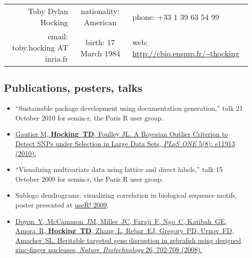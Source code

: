 \documentclass[11pt,a4paper]{article}
\begin{document}
\begin{tabular}{rcl}
{\Large Toby Dylan Hocking} & nationality: American &
phone: +33 1 39 63 54 99
\\
email: toby.hocking AT inria.fr & birth: 17 March 1984& 
web: \url{http://cbio.ensmp.fr/~thocking}
\end{tabular} 

\subsection*{Publications, posters, talks}
\begin{itemize}
\item ``Sustainable package development using documentation generation,'' talk 21 October 2010 for semin-r, the Paris R user group.
\item
\href{http://www.plosone.org/article/info\%3Adoi\%2F10.1371\%2Fjournal.pone.0011913}{Gautier M, {\bf Hocking~TD}, Foulley JL.
A Bayesian Outlier Criterion to Detect SNPs under Selection in Large
Data Sets, \emph{PLoS ONE} 5(8): e11913 (2010).}
\item ``Visualizing
multivariate data using lattice and direct labels,'' talk 15 October
2009 for semin-r, the Paris R user group.
\item Sublogo dendrograms:
visualizing correlation in biological sequence motifs, poster
presented at
\href{http://www.agrocampus-ouest.fr/math/useR-2009/}{useR! 2009}.
\item \href{http://www.ncbi.nlm.nih.gov/pubmed/18500334}{Doyon~Y, McCammon~JM, Miller~JC, Faraji~F, Ngo~C,
Katibah~GE, Amora~R, {\bf Hocking~TD}, Zhang~L, \mbox{Rebar~EJ}, Gregory~PD,
Urnov~FD, Amacher~SL. Heritable targeted gene disruption in zebrafish
using designed zinc-finger nucleases, \emph{Nature~Biotechnology}
26, 702-708 (2008).
}
\end{itemize}
\end{document}
